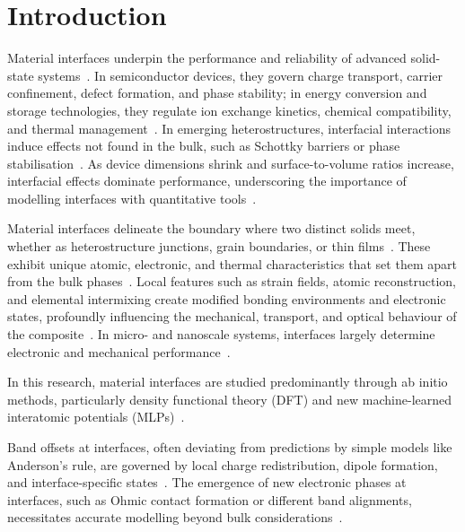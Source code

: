 \chapter{Introduction} \label{chapter:introduction}

\label{interface_importance} Material interfaces underpin the performance and reliability of advanced solid-state systems~\cite{Di_Liberto2022-gz}.
In semiconductor devices, they govern charge transport, carrier confinement, defect formation, and phase stability; in energy conversion and storage technologies, they regulate ion exchange kinetics, chemical compatibility, and thermal management~\cite{Maji2021-kc, Di_Liberto2022-gz, Cervantes2025-ze}.
In emerging heterostructures, interfacial interactions induce effects not found in the bulk, such as Schottky barriers or phase stabilisation~\cite{Low2025-on}.
As device dimensions shrink and surface-to-volume ratios increase, interfacial effects dominate performance, underscoring the importance of modelling interfaces with quantitative tools~\cite{Butler2019-ws, Leung2020-tv, Gerber2023-yd}.

\label{interface_foundation} Material interfaces delineate the boundary where two distinct solids meet, whether as heterostructure junctions, grain boundaries, or thin films~\nocite{}.
These exhibit unique atomic, electronic, and thermal characteristics that set them apart from the bulk phases~\cite{Gerber2023-yd, Di_Liberto2022-gz}.
Local features such as strain fields, atomic reconstruction, and elemental intermixing create modified bonding environments and electronic states, profoundly influencing the mechanical, transport, and optical behaviour of the composite~\cite{Khot2025-hh, Leitherer2023-ew, Maji2021-kc}.
In micro- and nanoscale systems, interfaces largely determine electronic and mechanical performance~\cite{Leung2020-tv}.

\newpage \label{material_interface_definition} In this research, material interfaces are studied predominantly through ab initio methods, particularly density functional theory (DFT) and new machine-learned interatomic potentials (MLPs)~\nocite{}.

Band offsets at interfaces, often deviating from predictions by simple models like Anderson's rule, are governed by local charge redistribution, dipole formation, and interface-specific states~\nocite{}.
The emergence of new electronic phases at interfaces, such as Ohmic contact formation or different band alignments, necessitates accurate modelling beyond bulk considerations~\nocite{}.

